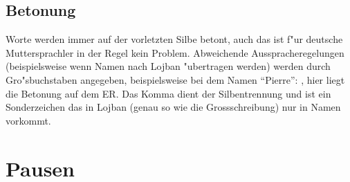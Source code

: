 \subsection{Betonung}
Worte werden immer auf der vorletzten Silbe betont, auch das ist f"ur deutsche Muttersprachler in der Regel kein Problem. Abweichende
Ausspracheregelungen (beispielsweise wenn Namen nach Lojban "ubertragen werden) werden durch Gro"sbuchstaben angegeben,
beispielsweise bei dem Namen ``Pierre'': , hier liegt die Betonung auf dem ER. Das Komma dient der Silbentrennung und ist
ein Sonderzeichen das in Lojban (genau so wie die Grossschreibung) nur in Namen vorkommt.

\section{Pausen}

